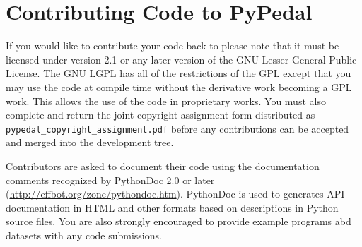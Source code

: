 \section{Contributing Code to PyPedal}
\label{sec:newfeatures-overview-contributing-code}
If you would like to contribute your code back to \PyPedal{} please note that it must be licensed under version 2.1 or any
later version of the GNU Lesser General Public License.  The GNU LGPL has all of the restrictions of the GPL except that you
may use the code at compile time without the derivative work becoming a GPL work. This allows the use of the code in
proprietary works.  You must also complete and return the joint copyright assignment form distributed as
\texttt{pypedal\_copyright\_assignment.pdf} before any contributions can be accepted and merged into the development tree.

Contributors are asked to document their code using the documentation comments recognized by PythonDoc 2.0 or later
(\url{http://effbot.org/zone/pythondoc.htm}).  PythonDoc is used to generates API documentation in HTML and other formats
based on descriptions in Python source files.  You are also strongly encouraged to provide example programs abd datasets
with any code submissions.